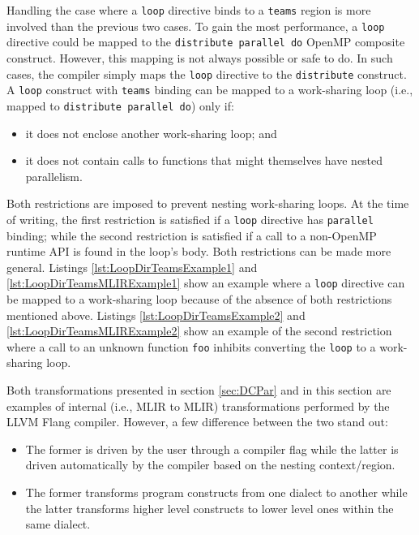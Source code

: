 \documentclass[acmtog,natbib=false]{acmart}
\newcommand{\code}[1]{\texttt{#1}\xspace}
\begin{document}
Handling the case where a \code{loop} directive binds to a \code{teams} region is more involved than the previous two cases.
To gain the most performance, a \code{loop} directive could be mapped to the \code{distribute parallel do} OpenMP composite construct.
However, this mapping is not always possible or safe to do.
In such cases, the compiler simply maps the \code{loop} directive to the \code{distribute} construct.
A \code{loop} construct with \code{teams} binding can be mapped to a work-sharing loop (i.e., mapped to \code{distribute parallel do}) only if:
\begin{itemize}
    \item it does not enclose another work-sharing loop; and
    \item it does not contain calls to functions that might themselves have nested parallelism.
\end{itemize}
Both restrictions are imposed to prevent nesting work-sharing loops.
At the time of writing, the first restriction is satisfied if a \code{loop} directive has \code{parallel} binding; while the second restriction is satisfied if a call to a non-OpenMP runtime API is found in the loop's body.
Both restrictions can be made more general.
Listings \ref{lst:LoopDirTeamsExample1} and \ref{lst:LoopDirTeamsMLIRExample1} show an example where a \code{loop} directive can be mapped to a work-sharing loop because of the absence of both restrictions mentioned above.
Listings \ref{lst:LoopDirTeamsExample2} and \ref{lst:LoopDirTeamsMLIRExample2} show an example of the second restriction where a call to an unknown function \code{foo} inhibits converting the \code{loop} to a work-sharing loop.

Both transformations presented in section \ref{sec:DCPar} and in this section are examples of internal (i.e., \ac{MLIR} to \ac{MLIR}) transformations performed by the LLVM Flang compiler. However, a few difference between the two stand out:
\begin{itemize}
    \item The former is driven by the user through a compiler flag while the latter is driven automatically by the compiler based on the nesting context/region.
    \item The former transforms program constructs from one dialect to another while the latter transforms higher level constructs to lower level ones within the same dialect.
\end{itemize}
\end{document}
